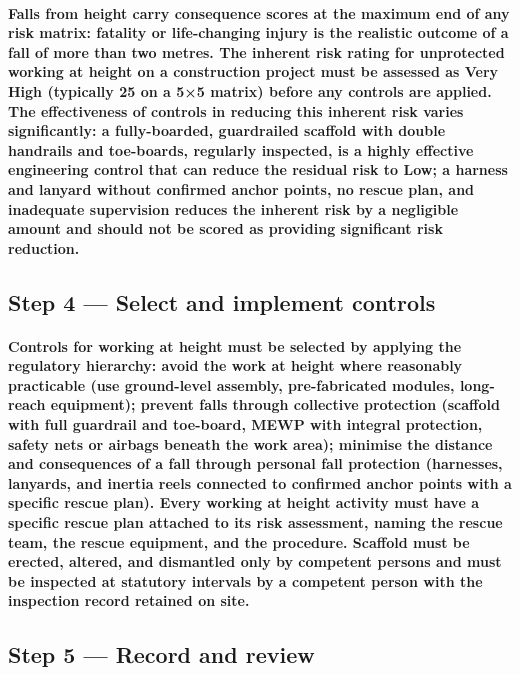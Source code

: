 \paragraph{Falls from height carry consequence scores at the maximum end of any risk matrix: fatality or life-changing injury is the realistic outcome of a fall of more than two metres. The inherent risk rating for unprotected working at height on a construction project must be assessed as Very High (typically 25 on a 5×5 matrix) before any controls are applied. The effectiveness of controls in reducing this inherent risk varies significantly: a fully-boarded, guardrailed scaffold with double handrails and toe-boards, regularly inspected, is a highly effective engineering control that can reduce the residual risk to Low; a harness and lanyard without confirmed anchor points, no rescue plan, and inadequate supervision reduces the inherent risk by a negligible amount and should not be scored as providing significant risk reduction.}

\subsection{Step 4 --- Select and implement controls}
\paragraph{Controls for working at height must be selected by applying the regulatory hierarchy: avoid the work at height where reasonably practicable (use ground-level assembly, pre-fabricated modules, long-reach equipment); prevent falls through collective protection (scaffold with full guardrail and toe-board, MEWP with integral protection, safety nets or airbags beneath the work area); minimise the distance and consequences of a fall through personal fall protection (harnesses, lanyards, and inertia reels connected to confirmed anchor points with a specific rescue plan). Every working at height activity must have a specific rescue plan attached to its risk assessment, naming the rescue team, the rescue equipment, and the procedure. Scaffold must be erected, altered, and dismantled only by competent persons and must be inspected at statutory intervals by a competent person with the inspection record retained on site.}

\subsection{Step 5 --- Record and review}
